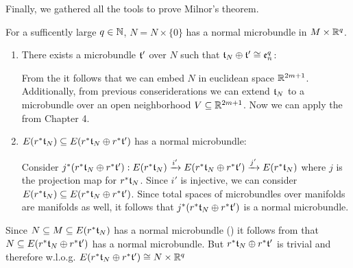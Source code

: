 Finally, we gathered all the tools to prove Milnor's theorem.

\newcommand{\whitney} {
    r^*\bt_N \oplus{} r^*\bt'
}
\newcommand{\rtn} {
    r^*\bt_N
}

For a sufficently large $q \in \mathbb{N}$, $N = N \times \{0\}$ has a normal microbundle in $M \times \mathbb{R}^q$.
\begin{myproof}
    \begin{enumerate}
        \item There exists a microbundle $\mathfrak{t}'$ over $N$ such that $\mathfrak{t}_N \oplus \mathfrak{t}' \cong \mathfrak{e}^q_n$:
        
        From the  it follows that we can embed $N$ in euclidean space $\mathbb{R}^{2m + 1}$.
        Additionally, from previous conseriderations we can extend $\mathfrak{t}_N$ to a microbundle over an open neighborhood $V \subseteq{} \mathbb{R}^{2m + 1}$.
        Now we can apply the  from Chapter 4.

        \item $E(\rtn) \sub E(\whitney)$ has a normal microbundle:

        Consider $\bundledef{j^*(\whitney)}{E(\rtn)}{E(\whitney)}{i'}{j'}$ where $j$ is the projection map for $\rtn$.
        Since $i'$ is injective, we can consider $E(\rtn) \sub E(\whitney)$.
        Since total spaces of microbundles over manifolds are manifolds as well, it follows that $j^*(\whitney)$ is a normal microbundle.
    \end{enumerate}
    Since $N \sub M \sub E(\rtn)$ has a normal microbundle () it follows from  that $N \subseteq{} E(r^*\mathfrak{t}_N \oplus r^*\mathfrak{t}')$ has a normal microbundle.
    But $r^*\mathfrak{t}_N \oplus r^*\mathfrak{t}'$ is trivial and therefore w.l.o.g. $E(\whitney) \cong N \times \R^q$
\end{myproof}